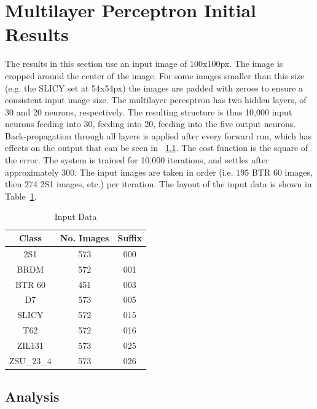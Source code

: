 \section{Multilayer Perceptron Initial Results}
The results in this section use an input image of 100x100px. The image is cropped around the center of the image. For some images smaller than this size (e.g. the SLICY set at 54x54px) the images are padded with zeroes to ensure a consistent input image size. The multilayer perceptron has two hidden layers, of 30 and 20 neurons, respectively. The resulting structure is thus 10,000 input neurons feeding into 30, feeding into 20, feeding into the five output neurons. Back-propagation through all layers is applied after every forward run, which has effects on the output that can be seen in ~\ref{sec:analysis}. The cost function is the square of the error. The system is trained for 10,000 iterations, and settles after approximately 300. The input images are taken in order (i.e. 195 BTR 60 images, then 274 2S1 images, etc.) per iteration. The layout of the input data is shown in Table~\ref{tab:input_data}. \\


\begin{table}
	\centering
	\begin{tabular}{|c|c|c|}
		\hline
		\textbf{Class} & \textbf{No. Images} & \textbf{Suffix} \\
		\hline
		
		2S1        & 573 & 000 \\ \hline
		BRDM       & 572 & 001 \\ \hline
		BTR 60     & 451 & 003 \\ \hline
		D7         & 573 & 005 \\ \hline
		SLICY      & 572 & 015 \\ \hline
		T62        & 572 & 016 \\ \hline
		ZIL131     & 573 & 025 \\ \hline
		ZSU\_23\_4 & 573 & 026 \\ \hline	
	\end{tabular}
	\caption{Input Data}
	\label{tab:input_data}
	\centering
\end{table}

 

\subsection{Analysis}\label{sec:analysis}

